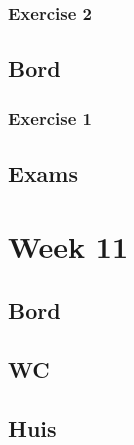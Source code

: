 \documentclass[a4paper]{report}
\begin{document}
\subsubsection{Exercise 2}



\subsection{Bord}

\subsubsection{Exercise 1}



\subsection{Exams}





\section{Week 11}

\subsection{Bord}




\subsection{WC}




\subsection{Huis}





\end{document}
